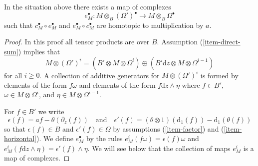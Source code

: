 \begin{lemma}
\label{lemma-find-homotopy}
In the situation above there exists a map of complexes
$$
e_M^\bullet :
M \otimes_B (\Omega')^\bullet
\longrightarrow
M \otimes_B \Omega^\bullet
$$
such that $c_M^\bullet \circ e_M^\bullet$
and $e_M^\bullet \circ c_M^\bullet$ are homotopic to
multiplication by $a$.
\end{lemma}

\begin{proof}
In this proof all tensor products are over $B$.
Assumption (\ref{item-direct-sum}) implies that
$$
M \otimes (\Omega')^i =
(B' \otimes M \otimes \Omega^i)
\oplus
(B' \text{d}z \otimes M \otimes \Omega^{i - 1})
$$
for all $i \geq 0$. A collection of additive generators for
$M \otimes (\Omega')^i$ is formed by elements of the form
$f \omega$ and elements of the form $f \text{d}z \wedge \eta$
where $f \in B'$, $\omega \in M \otimes \Omega^i$, and
$\eta \in M \otimes \Omega^{i - 1}$.

\medskip\noindent
For $f \in B'$ we write
$$
\epsilon(f) = af - \theta(\partial_z(f))
\quad\text{and}\quad
\epsilon'(f) = (\theta \otimes 1)(\text{d}_1(f)) - \text{d}_1(\theta(f))
$$
so that $\epsilon(f) \in B$ and $\epsilon'(f) \in \Omega$ by
assumptions (\ref{item-factor}) and (\ref{item-horizontal}).
We define $e_M^\bullet$ by the rules
$e^i_M(f\omega) = \epsilon(f) \omega$ and
$e^i_M(f \text{d}z \wedge \eta) = \epsilon'(f) \wedge \eta$.
We will see below that the collection of maps $e^i_M$ is a map of complexes.


\end{proof}
